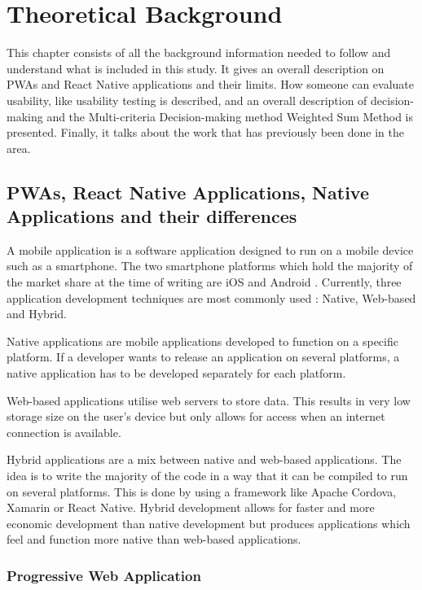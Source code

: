 \section{Theoretical Background}

This chapter consists of all the background information needed to follow and understand what is included in this study. It gives an overall description on PWAs and React Native applications and their limits. How someone can evaluate usability, like usability testing is described, and an overall description of decision-making and the Multi-criteria Decision-making method Weighted Sum Method is presented. Finally, it talks about the work that has previously been done in the area.

\subsection{PWAs, React Native Applications, Native Applications and their differences}

A mobile application is a software application designed to run on a mobile device such as a smartphone. The two smartphone platforms which hold the majority of the market share at the time of writing are iOS and Android \cite{MarketShareGlobal2020}. 
Currently, three application development techniques are most commonly used \cite{ThreeAppTypes}:  Native, Web-based and Hybrid. 

Native applications are mobile applications developed to function on a specific platform. If a developer wants to release an application on several platforms, a native application has to be developed separately for each platform. 

Web-based applications utilise web servers to store data. This results in very low storage size on the user’s device but only allows for access when an internet connection is available. 

Hybrid applications are a mix between native and web-based applications. The idea is to write the majority of the code in a way that it can be compiled to run on several platforms. This is done by using a framework like Apache Cordova, Xamarin or React Native. Hybrid development allows for faster and more economic development than native development but produces applications which feel and function more native than web-based applications. 

\subsubsection{Progressive Web Application}

